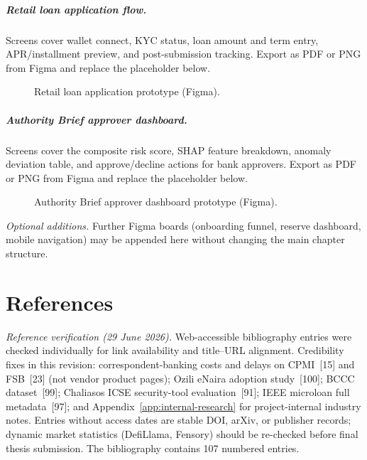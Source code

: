 \documentclass[12pt,a4paper]{report}
\begin{document}
\paragraph{Retail loan application flow.}
Screens cover wallet connect, KYC status, loan amount and term entry, APR/installment preview, and post-submission tracking. Export as PDF or PNG from Figma and replace the placeholder below.

\begin{figure}[H]
\centering
{}
\caption[Retail loan application prototype (Figma)]{Retail loan application prototype (Figma).}
\label{fig:ui-wireframe-retail}
\end{figure}

\paragraph{Authority Brief approver dashboard.}
Screens cover the composite risk score, SHAP feature breakdown, anomaly deviation table, and approve/decline actions for bank approvers. Export as PDF or PNG from Figma and replace the placeholder below.

\begin{figure}[H]
\centering
{}
\caption[Authority Brief approver dashboard prototype (Figma)]{Authority Brief approver dashboard prototype (Figma).}
\label{fig:ui-wireframe-approver}
\end{figure}

\noindent\textit{Optional additions.} Further Figma boards (onboarding funnel, reserve dashboard, mobile navigation) may be appended here without changing the main chapter structure.

\chapter*{References}
{}

\noindent\textit{Reference verification (29 June 2026).} Web-accessible bibliography entries were checked individually for link availability and title--URL alignment. Credibility fixes in this revision: correspondent-banking costs and delays on CPMI~[15] and FSB~[23] (not vendor product pages); Ozili eNaira adoption study~[100]; BCCC dataset~[99]; Chaliasos ICSE security-tool evaluation~[91]; IEEE microloan full metadata~[97]; and Appendix~\ref{app:internal-research} for project-internal industry notes. Entries without access dates are stable DOI, arXiv, or publisher records; dynamic market statistics (DefiLlama, Fensory) should be re-checked before final thesis submission. The bibliography contains 107 numbered entries.
\end{document}
